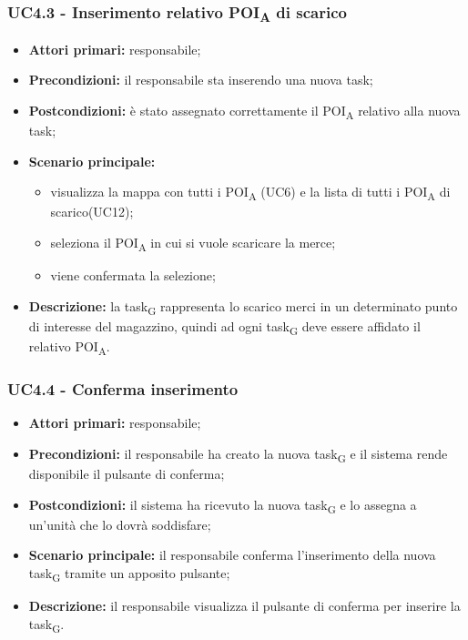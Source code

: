 \subsubsection{UC4.3 - Inserimento relativo \acrshort{POI}\textsubscript{A} di scarico}

\begin{itemize}
	\item 	\textbf{Attori primari:} responsabile;
	\item 	\textbf{Precondizioni:} il responsabile sta inserendo una nuova task;
	\item 	\textbf{Postcondizioni:} è stato assegnato correttamente il \acrshort{POI}\textsubscript{A} relativo alla nuova task;
	\item 	\textbf{Scenario principale:}
	\begin{itemize}
		\item visualizza la mappa con tutti i \acrshort{POI}\textsubscript{A} (UC6) e la lista di tutti i \acrshort{POI}\textsubscript{A} di scarico(UC12);
		\item seleziona il \acrshort{POI}\textsubscript{A} in cui si vuole scaricare la merce;
		\item viene confermata la selezione;
	\end{itemize}
	\item 	\textbf{Descrizione:} la \gls{task}\textsubscript{G} rappresenta lo scarico merci in un determinato punto di interesse del magazzino, quindi ad ogni \gls{task}\textsubscript{G} deve essere affidato il relativo \acrshort{POI}\textsubscript{A}.
\end{itemize}
\subsubsection{UC4.4 - Conferma inserimento}

\begin{itemize}
	\item 	\textbf{Attori primari:} responsabile;
	\item 	\textbf{Precondizioni:} il responsabile ha creato la nuova \gls{task}\textsubscript{G} e il sistema rende disponibile il pulsante di conferma;
	\item 	\textbf{Postcondizioni:} il sistema ha ricevuto la nuova \gls{task}\textsubscript{G} e lo assegna a un’unità che lo dovrà soddisfare;
	\item 	\textbf{Scenario principale:} il responsabile conferma l’inserimento della nuova \gls{task}\textsubscript{G} tramite un apposito pulsante;
	\item 	\textbf{Descrizione:} il responsabile visualizza il pulsante di conferma per inserire la \gls{task}\textsubscript{G}.
\end{itemize}


